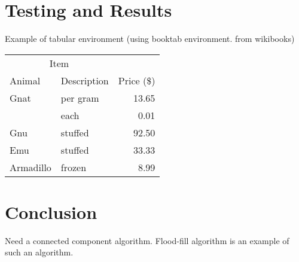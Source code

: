 \documentclass[12pt]{reedmcm}
\begin{document}
\section{Testing and Results}

Example of tabular environment (using booktab environment. from wikibooks) 

\begin{tabular}{llr}
\toprule
\multicolumn{2}{c}{Item} \\
\cmidrule(r){1-2}
Animal    & Description & Price (\$) \\
\midrule
Gnat      & per gram    & 13.65      \\
          & each        & 0.01       \\
Gnu       & stuffed     & 92.50      \\
Emu       & stuffed     & 33.33      \\
Armadillo & frozen      & 8.99       \\
\bottomrule
\end{tabular}

\section{Conclusion}
Need a connected component algorithm.
Flood-fill algorithm is an example of such an algorithm.

\renewcommand{\bibname}{References}

\nocite{*}

\end{document}
